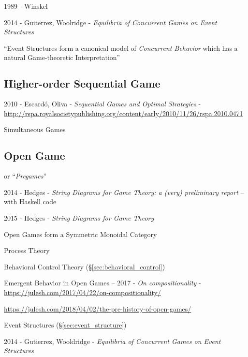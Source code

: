 1989 - Winskel

2014 - Guiterrez, Woolridge - \emph{Equilibria of Concurrent Games on Event
  Structures}

``Event Structures form a canonical model of \emph{Concurrent Behavior} which
has a natural Game-theoretic Interpretation''



\subsection{Higher-order Sequential Game}\label{sec:higherorder_sequential_game}

2010 - Escard\'o, Oliva - \emph{Sequential Games and Optimal Strategies} -
\url{http://rspa.royalsocietypublishing.org/content/early/2010/11/26/rspa.2010.0471}

Simultaneous Games



\subsection{Open Game}\label{sec:open_game}

or ``\emph{Pregames}''

2014 - Hedges - \emph{String Diagrams for Game Theory: a (very) preliminary
  report} -- with Haskell code

2015 - Hedges - \emph{String Diagrams for Game Theory}

Open Games form a Symmetric Monoidal Category

Process Theory

Behavioral Control Theory (\S\ref{sec:behavioral_control})

Emergent Behavior in Open Games --
2017 - \emph{On compositionality} -
\url{https://julesh.com/2017/04/22/on-compositionality/}

\url{https://julesh.com/2018/04/02/the-pre-history-of-open-games/}

Event Structures (\S\ref{sec:event_structure})

2014 - Gutierrez, Wooldridge - \emph{Equilibria of Concurrent Games on Event
  Structures}



